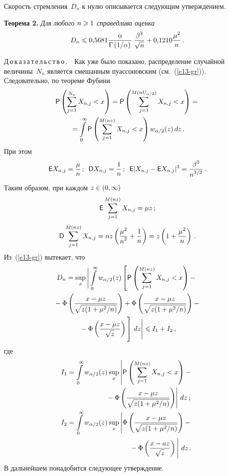 \begin{multicols}{2}
Скорость стремления~$D_n$ к нулю описывается следующим утверждением.

\smallskip

\noindent
\textbf{Теорема 2.} \textit{Для любого $n\hm\geqslant1$ справедлива оценка}
$$
D_n\leqslant 0{,}5681\displaystyle\frac{\displaystyle \alpha\mathstrut}{\displaystyle \Gamma\left({1}/{\alpha}\right)\mathstrut}\,
\displaystyle\frac{\displaystyle \beta^3\mathstrut}{\displaystyle \sqrt{n}\mathstrut} +0{,}1210\displaystyle\frac{\displaystyle \mu^2\mathstrut}{\displaystyle n\mathstrut}\,.
$$

\smallskip

\noindent
Д\,о\,к\,а\,з\,а\,т\,е\,л\,ь\,с\,т\,в\,о\,.\ \ Как уже было показано, распределение случайной
величины~$N_n$ является смешанным пуассоновским (см.~(\ref{e13-gr})).
Следовательно, по теореме Фубини
\begin{multline*}
{\sf P}\left(\sum\limits_{j=1}^{N_n}X_{n,j}<x\right)=
{\sf P}\left(\sum\limits_{j=1}^{M(nU_{\alpha/2})}X_{n,j}<x\right)={}\\
{}=
\int\limits_0^{\infty}{\sf P}\left(\sum\limits_{j=1}^{M(nz)}X_{n,j}<x\right)w_{\alpha/2}(z)\,dz\,.
\end{multline*}
При этом
$$
{\sf E}X_{n,j}=\displaystyle\frac{\displaystyle \mu\mathstrut}{\displaystyle n\mathstrut}\,;\enskip  {\sf D}X_{n,j}=\displaystyle\frac{\displaystyle 1\mathstrut}{\displaystyle n\mathstrut}\,;\enskip
{\sf E}|X_{n,j}-{\sf E}X_{n,j}|^3=\displaystyle\frac{\displaystyle \beta^3\mathstrut}{\displaystyle n^{3/2}\mathstrut}\,.
$$
Таким образом, при каждом $z\hm\in(0,\infty)$
$$
{\sf E}\sum\limits_{j=1}^{M(nz)}X_{n,j}=\mu z\,;
$$
$$
{\sf D}\sum\limits_{j=1}^{M(nz)}X_{n,j}=
nz\left(\displaystyle\frac{\displaystyle \mu^2\mathstrut}{\displaystyle n^2\mathstrut}+\displaystyle\frac{\displaystyle 1\mathstrut}{\displaystyle n\mathstrut}\right)=z\left(1+\displaystyle\frac{\displaystyle \mu^2\mathstrut}{\displaystyle n\mathstrut}\right)\,.
$$
Из~(\ref{e13-gr}) вытекает, что
\begin{multline}
D_n=\sup\limits_x
\Bigg|\int\limits_{0}^{\infty}w_{\alpha/2}(z)\left[{\sf P}\left(\sum\limits_{j=1}^{M(nz)}
X_{n,j}<x\right)-{}\right.\\
{}-\Phi\left(\fr{x-\mu z}{\sqrt{z(1+{\mu^2}/{n})}}\right)+
\Phi\left(\fr{x-\mu z}{\sqrt{z(1+{\mu^2}/{n})}}\right)-{}\\
\left.{}-\Phi\left(\fr{x-\mu z}
{\sqrt{z}}\right)
\vphantom{\sum\limits_{j=1}^{M(nz)}}
\right]\,dz\Bigg| \leqslant I_1+I_2\,,\label{e14-gr}
\end{multline}
где
\begin{align*}
I_1&=\int\limits_{0}^{\infty}w_{\alpha/2}(z)\sup\limits_x
\left\vert 
\vphantom{\fr{x-\mu z}
{\sqrt{z(1+{\mu^2}/{n})}}}
{\sf P}
\left(\sum\limits_{j=1}^{M(nz)}X_{n,j}<x\right)-{}\right.\\
&\left.\hspace*{19mm}{}-\Phi\left(\fr{x-\mu z}
{\sqrt{z(1+{\mu^2}/{n})}}\right)\right\vert\,dz\,;
\\
I_2&=\int\limits_{0}^{\infty}w_{\alpha/2}(z)
\sup\limits_x\left\vert\Phi\left(\fr{x-\mu z}
{\sqrt{z(1+{\mu^2}/{n})}}\right)-{}\right.\\
&\hspace*{31mm}\left.{}-\Phi\left(\fr{x-az}{\sqrt{z}}\right)
\vphantom{\fr{x-\mu z}
{\sqrt{z(1+{\mu^2}/{n})}}}\right\vert\,dz\,.
\end{align*}
В дальнейшем понадобится следующее утверждение.


\end{multicols}
